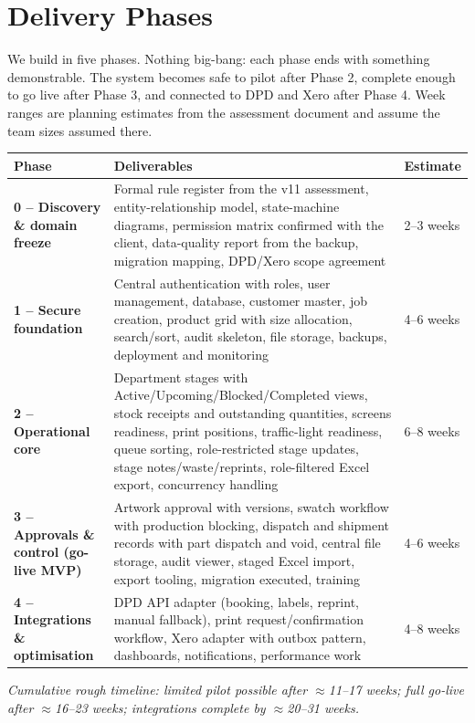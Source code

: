 \section{Delivery Phases}\label{sec:phases}

\begin{plainwords}
We build in five phases. Nothing big-bang: each phase ends with something demonstrable.
The system becomes safe to pilot after Phase 2, complete enough to go live after Phase 3,
and connected to DPD and Xero after Phase 4. Week ranges are planning estimates from the
assessment document and assume the team sizes assumed there.
\end{plainwords}

\noindent
\begin{tabularx}{\textwidth}{@{}p{3.1cm} X p{2.1cm}@{}}
\toprule
\textbf{Phase} & \textbf{Deliverables} & \textbf{Estimate} \\
\midrule
\textbf{0 -- Discovery \& domain freeze} &
  Formal rule register from the v11 assessment, entity-relationship model, state-machine
  diagrams, permission matrix confirmed with the client, data-quality report from the
  backup, migration mapping, DPD/Xero scope agreement & 2--3 weeks \\
\addlinespace
\textbf{1 -- Secure foundation} &
  Central authentication with roles, user management, database, customer master, job
  creation, product grid with size allocation, search/sort, audit skeleton, file
  storage, backups, deployment and monitoring & 4--6 weeks \\
\addlinespace
\textbf{2 -- Operational core} &
  Department stages with Active/Upcoming/Blocked/Completed views, stock receipts and
  outstanding quantities, screens readiness, print positions, traffic-light readiness,
  queue sorting, role-restricted stage updates, stage notes/waste/reprints, role-filtered
  Excel export, concurrency handling & 6--8 weeks \\
\addlinespace
\textbf{3 -- Approvals \& control (go-live MVP)} &
  Artwork approval with versions, swatch workflow with production blocking, dispatch and
  shipment records with part dispatch and void, central file storage, audit viewer,
  staged Excel import, export tooling, migration executed, training & 4--6 weeks \\
\addlinespace
\textbf{4 -- Integrations \& optimisation} &
  DPD API adapter (booking, labels, reprint, manual fallback), print
  request/confirmation workflow, Xero adapter with outbox pattern, dashboards,
  notifications, performance work & 4--8 weeks \\
\bottomrule
\end{tabularx}

\begin{center}
\footnotesize
\textit{Cumulative rough timeline: limited pilot possible after $\approx$11--17 weeks;
full go-live after $\approx$16--23 weeks; integrations complete by
$\approx$20--31 weeks.}
\end{center}
